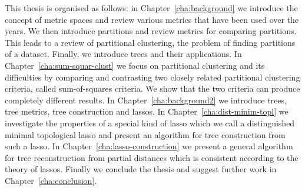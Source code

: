 This thesis is organised as follows: in Chapter~\ref{cha:background} we
introduce the concept of metric spaces and review various metrics that have
been used over the years.  We then introduce partitions and review metrics for
comparing partitions.  This leads to a review of partitional clustering, the
problem of finding partitions of a dataset.  Finally, we introduce trees and
their applications.  In Chapter~\ref{cha:sum-squar-clust} we focus on
partitional clustering and its difficulties by comparing and contrasting two
closely related partitional clustering criteria, called sum-of-squares
criteria.  We show that the two criteria can produce completely different
results.  In Chapter~\ref{cha:background2} we introduce trees, tree metrics,
tree construction and lassos.  In Chapter~\ref{cha:dist-minim-topl} we
investigate the properties of a special kind of lasso which we call a
distinguished minimal topological lasso and present an algorithm for tree
construction from such a lasso.  In Chapter~\ref{cha:lasso-construction} we
present a general algorithm for tree reconstruction from partial distances
which is consistent according to the theory of lassos.  Finally we conclude
the thesis and suggest further work in Chapter~\ref{cha:conclusion}.

